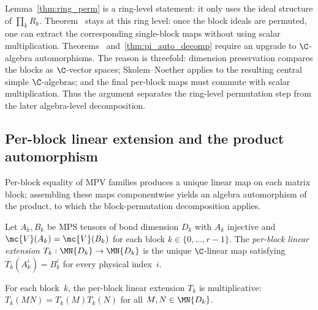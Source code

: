 \begin{remark}\label{rem:ring_vs_alg}
    Lemma~\ref{thm:ring_perm} is a ring-level statement: it only uses the
    ideal structure of $\prod_k R_k$.
    Theorem~\cite[``Paired component maps are bijections'']{QICLean2026Blueprint} stays at this ring level: once the
    block ideals are permuted, one can extract the corresponding single-block
    maps without using scalar multiplication.
    Theorems~\cite[``Summand matching and dimension preservation'']{QICLean2026Blueprint}
    and~\ref{thm:pi_auto_decomp} require an upgrade to $\C$-algebra
    automorphisms. The reason is threefold: dimension preservation compares
    the blocks as $\C$-vector spaces; Skolem--Noether applies to the resulting
    central simple $\C$-algebras; and the final per-block maps must commute
    with scalar multiplication. Thus the argument separates the ring-level
    permutation step from the later algebra-level decomposition.
\end{remark}

\subsection{Per-block linear extension and the product automorphism}

Per-block equality of MPV families produces a unique linear map on each
matrix block; assembling these maps componentwise yields an algebra
automorphism of the product, to which the block-permutation decomposition
applies.

\begin{definition}%
    \label{def:perBlockLinearExtension}
    \leanok
    Let $A_k, B_k$ be MPS tensors of bond dimension $D_k$ with
    $A_k$ injective and $\mc{V}(A_k) = \mc{V}(B_k)$ for each block
    $k \in \{0, \ldots, r{-}1\}$.
    The \emph{per-block linear extension} $T_k : \MN{D_k} \to \MN{D_k}$
    is the unique $\C$-linear map satisfying $T_k(A_k^i) = B_k^i$
    for every physical index~$i$.
\end{definition}

\begin{lemma}%
    \label{lem:perBlockLinearExtension_mul}
    \leanok
    For each block~$k$, the per-block linear extension $T_k$ is
    multiplicative:
    $T_k(MN) = T_k(M)T_k(N)$ for all $M, N \in \MN{D_k}$.
\end{lemma}

